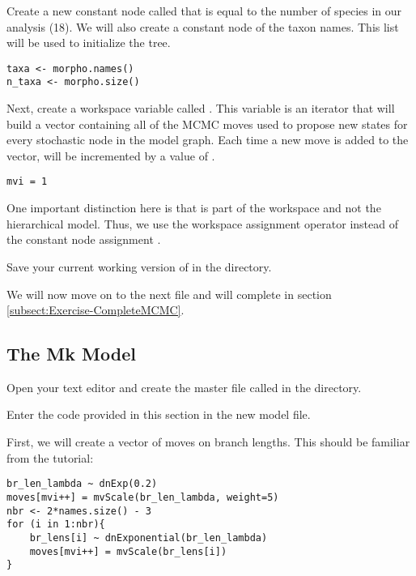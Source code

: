 Create a new constant node called  that is equal to the number of species in our analysis (18). 
We will also create a constant node of the taxon names.
This list will be used to initialize the tree.

{\tt \begin{snugshade*}
\begin{lstlisting}
taxa <- morpho.names()
n_taxa <- morpho.size() 
\end{lstlisting}
\end{snugshade*}}

Next, create a workspace variable called . 
This variable is an iterator that will build a vector containing all of the MCMC moves used to propose new states for every stochastic node in the model graph. 
Each time a new move is added to the vector,  will be incremented by a value of .
{\tt \begin{snugshade*}
\begin{lstlisting}
mvi = 1
\end{lstlisting}
\end{snugshade*}}
One important distinction here is that  is part of the \RevBayes workspace and not the hierarchical model. 
Thus, we use the workspace assignment operator \cl{=} instead of the constant node assignment \cl{<-}. 

{\begin{framed}
Save your current working version of  in the  directory.

We will now move on to the next \Rev file and will complete  in section \ref{subsect:Exercise-CompleteMCMC}.
\end{framed}}


\bigskip
\subsection{The Mk Model}

{\begin{framed}
Open your text editor and create the master \Rev file called {\textcolor{red}{}} in the  directory.

Enter the \Rev code provided in this section in the new model file.
\end{framed}}

First, we will create a vector of moves on branch lengths. 
This should be familiar from the  tutorial:
{\tt \begin{snugshade*}
\begin{lstlisting}
br_len_lambda ~ dnExp(0.2)
moves[mvi++] = mvScale(br_len_lambda, weight=5)
nbr <- 2*names.size() - 3
for (i in 1:nbr){
    br_lens[i] ~ dnExponential(br_len_lambda)
    moves[mvi++] = mvScale(br_lens[i]) 
}
\end{lstlisting}
\end{snugshade*}}

